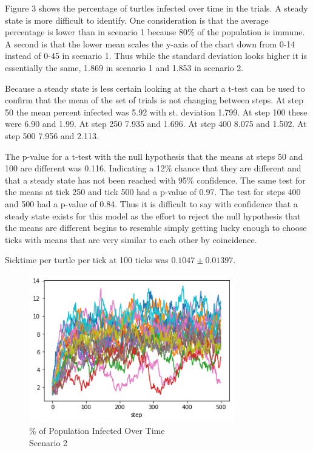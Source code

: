 \documentclass[11pt]{article} %
\begin{document}

 Figure 3 shows the percentage of turtles infected over time in the trials. A steady state is more difficult to identify. One consideration is that the average percentage is lower than in scenario 1 because 80\% of the population is immune. A second is that the lower mean scales the y-axis of the chart down from 0-14 instead of 0-45 in scenario 1. Thus while the standard deviation looks higher it is essentially the same, 1.869 in scenario 1 and 1.853 in scenario 2. 

Because a steady state is less certain looking at the chart a t-test can be used to confirm that the mean of the set of trials is not changing between steps. At step 50 the mean percent infected was 5.92 with st. deviation 1.799. At step 100 these were 6.90 and 1.99. At step 250 7.935 and 1.696. At step 400 8.075 and 1.502. At step 500 7.956 and 2.113. 

The p-value for a t-test with the null hypothesis that the means at steps 50 and 100 are different was 0.116. Indicating a 12\% chance that they are different and that a steady state has not been reached with 95\% confidence. The same test for the means at tick 250 and tick 500 had a p-value of 0.97. The test for steps 400 and 500 had a p-value of 0.84. Thus it is difficult to say with confidence that a steady state exists for this model as the effort to reject the null hypothesis that the means are different begins to resemble simply getting lucky enough to choose ticks with means that are very similar to each other by coincidence. 

Sicktime per turtle per tick at 100 ticks was $ 0.1047 \pm 0.01397$.

\begin{figure}
\centering
\includegraphics[width=0.8\textwidth]{20-runs-scenario-2-steady-state}
\caption{\% of Population Infected Over Time \\ Scenario 2}
\end{figure}
\end{document}
